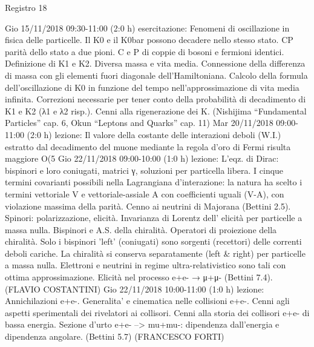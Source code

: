 \begin{frame}{Registro 18}
\begin{itemize}
{Gio 15/11/2018 09:30-11:00 (2:0 h) esercitazione: Fenomeni di oscillazione in fisica delle particelle. Il K0 e il K0bar possono decadere nello stesso stato. CP parità dello stato a due pioni. C e P di coppie di bosoni e fermioni identici. Definizione di K1 e K2. Diversa massa e vita media. Connessione della differenza di massa con gli elementi fuori diagonale dell’Hamiltoniana. Calcolo della formula dell’oscillazione di K0 in funzione del tempo nell’approssimazione di vita media infinita. Correzioni necessarie per tener conto della probabilità di decadimento di K1 e K2 (λ1 e λ2 risp.). Cenni alla rigenerazione dei K. (Nishijima “Fundamental Particles” cap. 6, Okun “Leptons and Quarks” cap. 11)
Mar 20/11/2018 09:00-11:00 (2:0 h) lezione: Il valore della costante delle interazioni deboli (W.I.) estratto dal decadimento del muone mediante la regola d'oro di Fermi risulta maggiore O(5%
Gio 22/11/2018 09:00-10:00 (1:0 h) lezione: L'eqz. di Dirac: bispinori e loro coniugati, matrici γ, soluzioni per particella libera. I cinque termini covarianti possibili nella Lagrangiana d'interazione: la natura ha scelto i termini vettoriale V e vettoriale-assiale A con coefficienti uguali (V-A), con violazione massima della parità. Cenno ai neutrini di Majorana (Bettini 2.5). Spinori: polarizzazione, elicità. Invarianza di Lorentz dell' elicità per particelle a massa nulla. Bispinori e A.S. della chiralità. Operatori di proiezione della chiralità. Solo i bispinori 'left' (coniugati) sono sorgenti (recettori) delle correnti deboli cariche. La chiralità si conserva separatamente (left & right) per particelle a massa nulla. Elettroni e neutrini in regime ultra-relativistico sono tali con ottima approssimazione. Elicità nel processo e+e- → μ+μ- (Bettini 7.4). (FLAVIO COSTANTINI)
Gio 22/11/2018 10:00-11:00 (1:0 h) lezione: Annichilazioni e+e-. Generalita' e cinematica nelle collisioni e+e-. Cenni agli aspetti sperimentali dei rivelatori ai collisori. Cenni alla storia dei collisori e+e- di bassa energia. Sezione d'urto e+e- --> mu+mu-: dipendenza dall'energia e dipendenza angolare. (Bettini 5.7) (FRANCESCO FORTI)
}
\end{itemize}
\end{frame}
